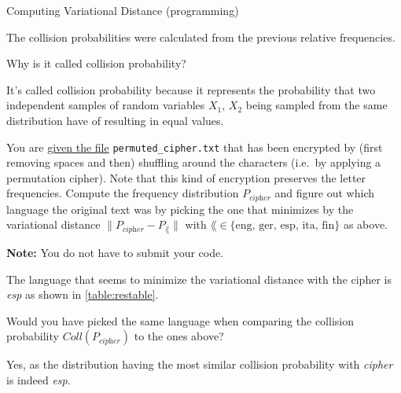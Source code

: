 \documentclass[a4paper,10pt]{article}
\begin{document}
\begin{nproblem}{8}{Computing Variational Distance (programming)}
\begin{solution}
The collision probabilities were calculated from the previous relative frequencies.


\end{solution}

\begin{subproblem}{1}
 Why is it called collision probability?
\end{subproblem}
\begin{solution}
It's called collision probability because it represents the probability that two independent
samples of random variables $X_1$, $X_2$ being sampled from the same distribution have of resulting
in equal values.
\end{solution}

\begin{subproblem}{2}
  You are \href{https://github.com/cschaffner/InformationTheory/blob/master/Problems/HW1/permuted_cipher.txt}{given the file} {\texttt{permuted\_cipher.txt}} that has been encrypted by (first removing spaces and then) shuffling around the
characters (i.e.\ by applying a permutation cipher). Note that this kind of 
encryption preserves the letter frequencies. Compute the frequency distribution
$P_{\textit{cipher}}$ and figure out which language the original text was by
picking the one that minimizes by the variational distance
$\| P_{\textit{cipher}} - P_{\lang}\|$ with $\lang \in \{
\textrm{eng, ger, esp, ita, fin} \}$ as above.

\textbf{Note:} You do not have to submit your code.
\end{subproblem}
\begin{solution}
The language that seems to minimize the variational distance with the cipher is \textit{esp} as shown
in \autoref{table:restable}.
\end{solution}

\begin{subproblem}{1}
Would you have picked the same language when comparing the collision probability $Coll(P_{\textit{cipher}})$ to the ones above?
\end{subproblem}
\begin{solution}
Yes, as the distribution having the most similar collision probability with \textit{cipher} is indeed \textit{esp}.
\end{solution}

\end{nproblem}




\end{document}
